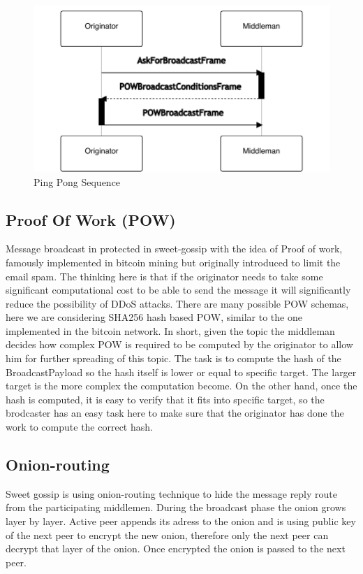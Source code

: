 \documentclass{article}
\begin{document}
\begin{figure}
	\centering
	\includegraphics[scale=1.0]{PingPong.pdf}
	\caption{Ping Pong Sequence}
	\label{fig:fr:pingpong}
\end{figure}

\subsection{Proof Of Work (POW)}
Message broadcast in protected in sweet-gossip with the idea of Proof of work, famously implemented in bitcoin mining but originally introduced to limit the email spam. The thinking here is that if the originator needs to take some significant computational cost to be able to send the message it will significantly reduce the possibility of DDoS attacks. There are many possible POW schemas, here we are considering SHA256 hash based POW, similar to the one implemented in the bitcoin network. In short, given the topic the middleman decides how complex POW is required to be computed by the originator to allow him for further spreading of this topic. The task is to compute the hash of the BroadcastPayload so the hash itself is lower or equal to specific target. The larger target is the more complex the computation become. On the other hand, once the hash is computed, it is easy to verify that it fits into specific target, so the brodcaster has an easy task here to make sure that the originator has done the work to compute the correct hash.

\subsection{Onion-routing}

Sweet gossip is using onion-routing technique to hide the message reply route from the participating middlemen. During the broadcast phase the onion grows layer by layer. Active peer appends its adress to the onion and is using public key of the next peer to encrypt the new onion, therefore only the next peer can decrypt that layer of the onion. Once encrypted the onion is passed to the next peer.
\end{document}
